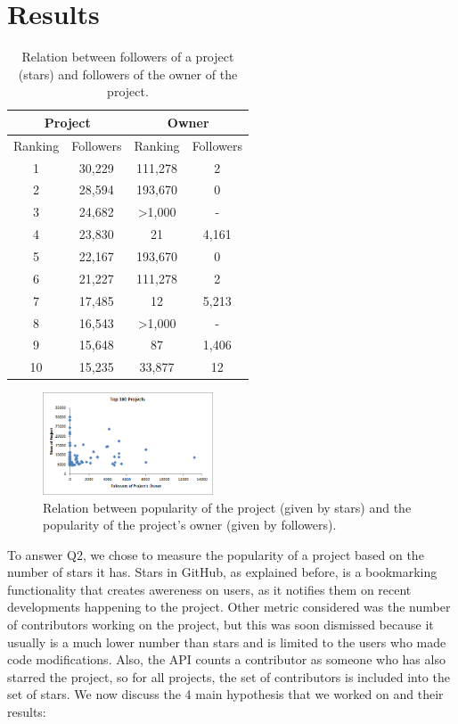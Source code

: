 
\section{Results}
\begin{table}
\centering
\begin{tabular}{ | c | c | c | c | }
	\hline
	\multicolumn{2}{|c|}{Project} & \multicolumn{2}{|c|}{Owner} \\ \hline
	Ranking & Followers & Ranking & Followers \\ \hline
	1 & 30,229 & 111,278 & 2 \\ \hline
	2 & 28,594 & 193,670 & 0 \\ \hline
	3 & 24,682 & >1,000 & -  \\ \hline
	4 & 23,830 & 21 & 4,161 \\ \hline
	5 & 22,167 & 193,670 & 0 \\ \hline
	6 & 21,227 & 111,278 & 2 \\ \hline
	7 & 17,485 & 12 & 5,213 \\ \hline
	8 & 16,543 & >1,000 & - \\ \hline
	9 & 15,648 & 87 & 1,406 \\ \hline
	10 & 15,235 & 33,877 & 12 \\ \hline
\end{tabular}
\caption{Relation between followers of a project (stars) and followers of the owner of the project. }
\label{tbl:owner}
\end{table}
\label{sec:results}
\begin{figure}
	\centering
	\includegraphics[width=0.45\textwidth]{./img/top100Owner.png}
	\caption{Relation between popularity of the project (given by stars) and the popularity of the project's owner (given by followers).}
	\label{fig:owner}
\end{figure}

To answer Q2, we chose to measure the popularity of a project based on the number of stars it has. Stars in GitHub, as explained before, is a bookmarking functionality that creates awereness on users, as it notifies them on recent developments happening to the project. Other metric considered was the number of contributors working on the project, but this was soon dismissed because it usually is a much lower number than stars and is limited to the users who made code modifications. Also, the API counts a contributor as someone who has also starred the project, so for all projects, the set of contributors is included into the set of stars. We now discuss the 4 main hypothesis that we worked on and their results:

